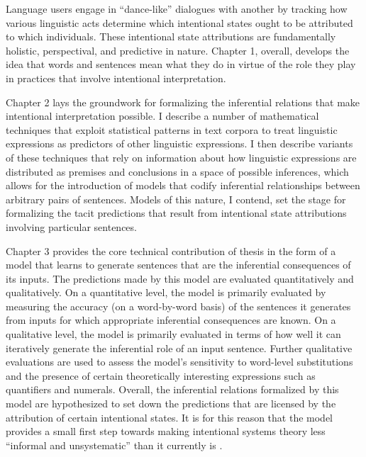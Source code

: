Language users engage in ``dance-like'' dialogues with another by tracking how various linguistic acts determine which intentional states ought to be attributed to which individuals. These intentional state attributions are fundamentally holistic, perspectival, and predictive in nature. Chapter 1, overall, develops the idea that words and sentences mean what they do in virtue of the role they play in practices that involve intentional interpretation.

Chapter 2 lays the groundwork for formalizing the inferential relations that make intentional interpretation possible. I describe a number of mathematical techniques that exploit statistical patterns in text corpora to treat linguistic expressions as predictors of other linguistic expressions. I then describe variants of these techniques that rely on information about how linguistic expressions are distributed as premises and conclusions in a space of possible inferences, which allows for the introduction of models that codify inferential relationships between arbitrary pairs of sentences. Models of this nature, I contend, set the stage for formalizing the tacit predictions that result from intentional state attributions involving particular sentences. 

Chapter 3 provides the core technical contribution of thesis in the form of a model that learns to generate sentences that are the inferential consequences of its inputs. The predictions made by this model are evaluated quantitatively and qualitatively. On a quantitative level, the model is primarily evaluated by measuring the accuracy (on a word-by-word basis) of the sentences it generates from inputs for which appropriate inferential consequences are known. On a qualitative level, the model is primarily evaluated in terms of how well it can iteratively generate the inferential role of an input sentence. Further qualitative evaluations are used to assess the model's sensitivity to word-level substitutions and the presence of certain theoretically interesting expressions such as quantifiers and numerals. Overall, the inferential relations formalized by this model are hypothesized to set down the predictions that are licensed by the attribution of certain intentional states. It is for this reason that the model provides a small first step towards making intentional systems theory less ``informal and unsystematic'' than it currently is \citep[][p. 67]{Dennett:1987}.

